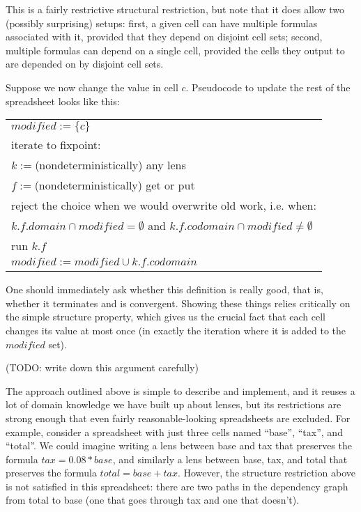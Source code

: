 \documentclass{article}
\begin{document}
This is a fairly restrictive structural restriction, but note that it does
allow two (possibly surprising) setups: first, a given cell can have
multiple formulas associated with it, provided that they depend on disjoint
cell sets; second, multiple formulas can depend on a single cell, provided
the cells they output to are depended on by disjoint cell sets.

Suppose we now change the value in cell $c$. Pseudocode to update the rest
of the spreadsheet looks like this:

\newcommand\assign{\mathop{:=}}
\newcommand\modified{\mathit{modified}}
\newcommand\domain{\mathit{domain}}
\newcommand\codomain{\mathit{codomain}}
\begin{tabular}{l}
$\modified\assign\{c\}$ \\
iterate to fixpoint: \\
\qquad $k \assign $(nondeterministically) any lens \\
\qquad $f \assign $(nondeterministically) get or put \\
\qquad reject the choice when we would overwrite old work, i.e. when: \\
\qquad\qquad $k.f.\domain \cap \modified = \emptyset$ and $k.f.\codomain \cap \modified \ne \emptyset$ \\
\qquad run $k.f$ \\
\qquad $\modified \assign \modified \cup k.f.\codomain$
\end{tabular}

One should immediately ask whether this definition is really good, that is,
whether it terminates and is convergent. Showing these things relies
critically on the simple structure property, which gives us the crucial fact
that each cell changes its value at most once (in exactly the iteration
where it is added to the $\modified$ set).

(TODO: write down this argument carefully)

\newcommand{\tax}{\mathit{tax}}
\newcommand{\base}{\mathit{base}}
\newcommand{\total}{\mathit{total}}
The approach outlined above is simple to describe and implement, and it
reuses a lot of domain knowledge we have built up about lenses, but its
restrictions are strong enough that even fairly reasonable-looking
spreadsheets are excluded. For example, consider a spreadsheet with just
three cells named ``base'', ``tax'', and ``total''. We could imagine writing
a lens between base and tax that preserves the formula
$\tax=0.08*\base$, and similarly a lens between base, tax, and total
that preserves the formula $\total=\base+\tax$. However, the structure
restriction above is not satisfied in this spreadsheet: there are two paths
in the dependency graph from total to base (one that goes through tax and
one that doesn't).
\end{document}
